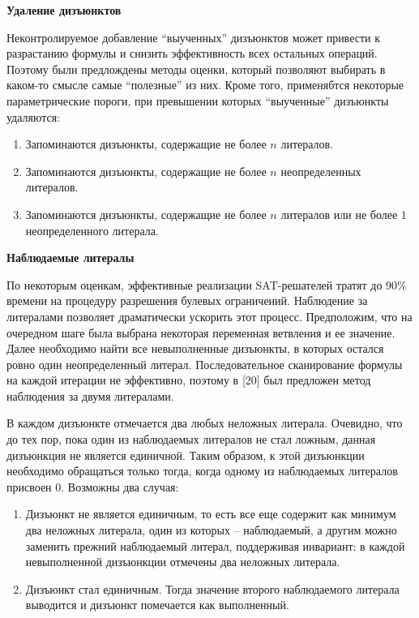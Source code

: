 \textbf{Удаление дизъюнктов}

Неконтролируемое добавление \enquote{выученных} дизъюнктов может привести к разрастанию формулы и снизить эффективность всех остальных операций. Поэтому были предлождены методы оценки, который позволяют выбирать в каком-то смысле самые \enquote{полезные} из них. Кроме того, применябтся некоторые параметрические пороги, при превышении которых \enquote{выученные} дизъюнкты удаляются:

\begin{enumerate}[leftmargin=1cm,topsep=0pt,itemsep=-1ex,partopsep=1ex,parsep=1ex,label=\arabic{*}.]

\item Запоминаются дизъюнкты, содержащие не более $n$ литералов.

\item Запоминаются дизъюнкты, содержащие не более $n$ неопределенных литералов.

\item Запоминаются дизъюнкты, содержащие не более $n$ литералов или не более $1$ неопределенного литерала.

\end{enumerate}

\textbf{Наблюдаемые литералы}

По некоторым оценкам, эффективные реализации SAT-решателей тратят до $90\%$ времени на процедуру разрешения булевых ограничений. Наблюдение за литералами позволяет драматически ускорить этот процесс. Предположим, что на очередном шаге была выбрана некоторая переменная ветвления и ее значение. Далее необходимо найти все невыполненные дизъюнкты, в которых остался ровно один неопределенный литерал. Последовательное сканирование формулы на каждой итерации не эффективно, поэтому в [20] был предложен метод наблюдения за двумя литералами.

В каждом дизъюнкте отмечается два любых неложных литерала. Очевидно, что до тех пор, пока один из наблюдаемых литералов не стал ложным, данная дизъюнкция не является единичной. Таким образом, к этой дизъюнкции необходимо обращаться только тогда, когда одному из наблюдаемых литералов присвоен $0$. Возможны два случая:

\begin{enumerate}[leftmargin=1cm,topsep=0pt,itemsep=-1ex,partopsep=1ex,parsep=1ex,label=\arabic{*}.]

\item Дизъюнкт не является единичным, то есть все еще содержит как минимум два неложных литерала, один из которых – наблюдаемый, а другим можно заменить прежний наблюдаемый литерал, поддерживая инвариант: в каждой невыполненной дизъюнкции отмечены два неложных литерала.

\item Дизъюнкт стал единичным. Тогда значение второго наблюдаемого литерала выводится и дизъюнкт помечается как выполненный.

\end{enumerate}

